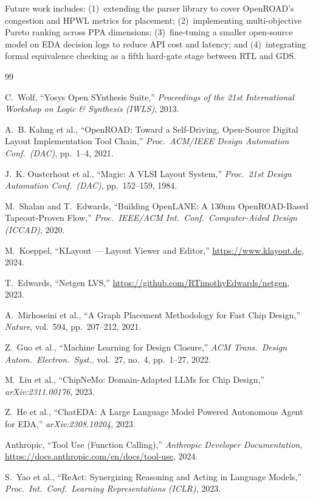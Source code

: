 \documentclass[conference]{IEEEtran}
\begin{document}
Future work includes: (1)~extending the parser library to cover
OpenROAD's congestion and HPWL metrics for placement; (2)~implementing
multi-objective Pareto ranking across PPA dimensions; (3)~fine-tuning
a smaller open-source model on EDA decision logs to reduce API
cost and latency; and (4)~integrating formal equivalence checking
as a fifth hard-gate stage between RTL and GDS.

\balance

\begin{thebibliography}{99}

C.~Wolf, ``Yosys Open SYnthesis Suite,''
\textit{Proceedings of the 21st International Workshop on Logic \& Synthesis (IWLS)},
2013.

A.~B. Kahng et al., ``OpenROAD: Toward a Self-Driving, Open-Source
Digital Layout Implementation Tool Chain,''
\textit{Proc.\ ACM/IEEE Design Automation Conf.\ (DAC)},
pp.\ 1--4, 2021.

J.~K. Ousterhout et al., ``Magic: A VLSI Layout System,''
\textit{Proc.\ 21st Design Automation Conf.\ (DAC)},
pp.\ 152--159, 1984.

M.~Shalan and T.~Edwards, ``Building OpenLANE: A 130nm OpenROAD-Based
Tapeout-Proven Flow,''
\textit{Proc.\ IEEE/ACM Int.\ Conf.\ Computer-Aided Design (ICCAD)},
2020.

M.~Koeppel, ``KLayout — Layout Viewer and Editor,''
\url{https://www.klayout.de}, 2024.

T.~Edwards, ``Netgen LVS,''
\url{https://github.com/RTimothyEdwards/netgen}, 2023.

A.~Mirhoseini et al., ``A Graph Placement Methodology for Fast
Chip Design,'' \textit{Nature}, vol.\ 594, pp.\ 207--212, 2021.

Z.~Guo et al., ``Machine Learning for Design Closure,''
\textit{ACM Trans.\ Design Autom.\ Electron.\ Syst.}, vol.\ 27,
no.\ 4, pp.\ 1--27, 2022.

M.~Liu et al., ``ChipNeMo: Domain-Adapted LLMs for Chip Design,''
\textit{arXiv:2311.00176}, 2023.

Z.~He et al., ``ChatEDA: A Large Language Model Powered Autonomous
Agent for EDA,'' \textit{arXiv:2308.10204}, 2023.

Anthropic, ``Tool Use (Function Calling),''
\textit{Anthropic Developer Documentation},
\url{https://docs.anthropic.com/en/docs/tool-use}, 2024.

S.~Yao et al., ``ReAct: Synergizing Reasoning and Acting in Language
Models,'' \textit{Proc.\ Int.\ Conf.\ Learning Representations (ICLR)},
2023.

\end{thebibliography}
\end{document}
